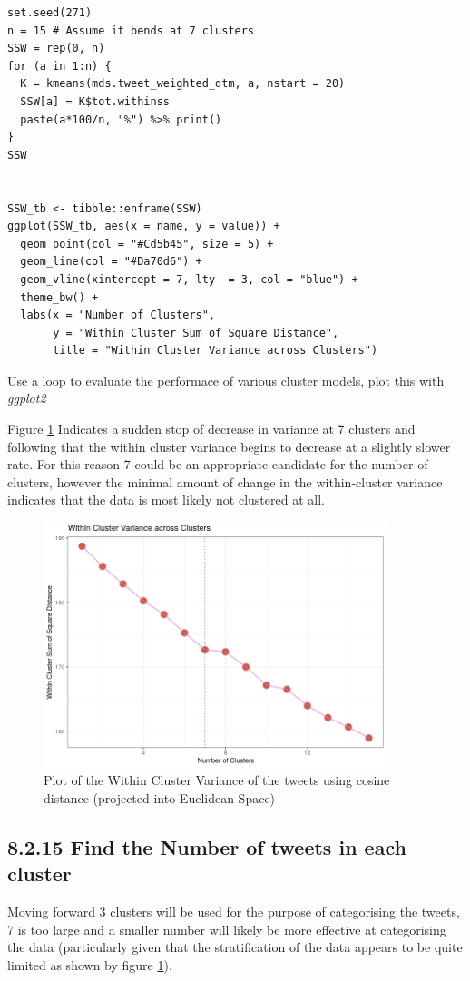 \documentclass[11pt]{article}
\begin{document}
\begin{listing}[htbp]
\begin{verbatim}
set.seed(271)
n = 15 # Assume it bends at 7 clusters
SSW = rep(0, n)
for (a in 1:n) {
  K = kmeans(mds.tweet_weighted_dtm, a, nstart = 20)
  SSW[a] = K$tot.withinss
  paste(a*100/n, "%") %>% print()
}
SSW


SSW_tb <- tibble::enframe(SSW)
ggplot(SSW_tb, aes(x = name, y = value)) +
  geom_point(col = "#Cd5b45", size = 5) +
  geom_line(col = "#Da70d6") +
  geom_vline(xintercept = 7, lty  = 3, col = "blue") +
  theme_bw() +
  labs(x = "Number of Clusters",
       y = "Within Cluster Sum of Square Distance",
       title = "Within Cluster Variance across Clusters")
\end{verbatim}
\caption{\label{orga6fd00e}Use a loop to evaluate the performace of various cluster models, plot this with \emph{ggplot2}}
\end{listing}

Figure \ref{fig:orgd5330d3} Indicates a sudden stop of decrease in variance at 7 clusters and following that the within cluster variance begins to decrease at a slightly slower rate. For this reason 7 could be an appropriate candidate for the number of clusters, however the minimal amount of change in the within-cluster variance indicates that the data is most likely not clustered at all.


\begin{figure}[htbp]
\centering
\includegraphics[width=10cm]{./Figures/Q14WithinClusterVariance.png}
\caption{\label{fig:orgd5330d3}Plot of the Within Cluster Variance of the tweets using cosine distance (projected into Euclidean Space)}
\end{figure}

\subsection{8.2.15 Find the Number of tweets in each cluster}
\label{sec:org63af233}
Moving forward 3 clusters will be used for the purpose of categorising the
tweets, 7 is too large and a smaller number will likely be more effective at
categorising the data (particularly given that the stratification of the data
appears to be quite limited as shown by figure \ref{fig:orgd5330d3}).
\end{document}
